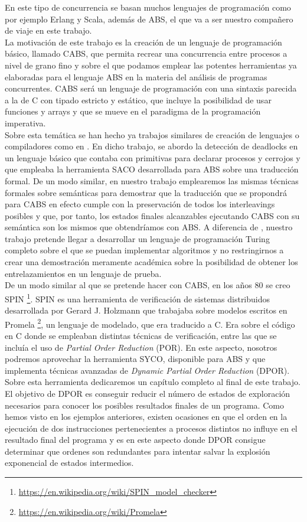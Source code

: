 En este tipo de concurrencia se basan muchos lenguajes de programación como por ejemplo Erlang y Scala, además de ABS, el que va a ser nuestro compañero de viaje en este trabajo.\\

La motivación de este trabajo es la creación de un lenguaje de programación básico, llamado CABS, que permita recrear una concurrencia entre procesos a nivel de grano fino y sobre el que podamos emplear las potentes herramientas ya elaboradas para el lenguaje ABS en la materia del análisis de programas concurrentes. CABS será un lenguaje de programación con una sintaxis parecida a la de C con tipado estricto y estático, que incluye la posibilidad de usar funciones y arrays y que se mueve en el paradigma de la programación imperativa.\\

Sobre esta temática se han hecho ya trabajos similares de creación de lenguajes o compiladores como en \cite{Alicia}. En dicho trabajo, se abordo la detección de deadlocks en un lenguaje básico que contaba con primitivas para declarar procesos y cerrojos y que empleaba la herramienta SACO desarrollada para ABS sobre una traducción formal. De un modo similar, en nuestro trabajo emplearemos las mismas técnicas formales sobre semánticas para demostrar que la traducción que se propondrá para CABS en efecto cumple con la preservación de todos los interleavings posibles y que, por tanto, los estados finales alcanzables ejecutando CABS con su semántica son los mismos que obtendríamos con ABS. A diferencia de \cite{Alicia}, nuestro trabajo pretende llegar a desarrollar un lenguaje de programación Turing completo sobre el que se puedan implementar algoritmos y no restringirnos a crear una demostración meramente académica sobre la posibilidad de obtener los entrelazamientos en un lenguaje de prueba.\\

De un modo similar al que se pretende hacer con CABS, en los años 80 se creo SPIN \footnote{\url{https://en.wikipedia.org/wiki/SPIN_model_checker}}. SPIN es una herramienta de verificación de sistemas distribuidos desarrollada por Gerard J. Holzmann que trabajaba sobre modelos escritos en Promela \footnote{\url{https://en.wikipedia.org/wiki/Promela}}, un lenguaje de modelado, que era traducido a C. Era sobre el código en C donde se empleaban distintas técnicas de verificación, entre las que se incluía el uso de \emph{Partial Order Reduction} (POR). En este aspecto, nosotros podremos aprovechar la herramienta SYCO, disponible para ABS y que implementa técnicas avanzadas de \emph{Dynamic Partial Order Reduction} (DPOR). Sobre esta herramienta dedicaremos un capítulo completo al final de este trabajo. El objetivo de DPOR es conseguir reducir el número de estados de exploración necesarios para conocer los posibles resultados finales de un programa. Como hemos visto en los ejemplos anteriores, existen ocasiones en que el orden en la ejecución de dos instrucciones pertenecientes a procesos distintos no influye en el resultado final del programa y es en este aspecto donde DPOR consigue determinar que ordenes son redundantes para intentar salvar la explosión exponencial de estados intermedios.\\

